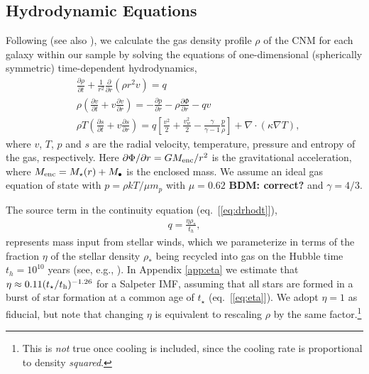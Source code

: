 \documentclass[usenatbib,fleqn]{mn2e}
\newcommand{\dxdy}[2]{\frac{\partial #1}{\partial #2} }
\newcommand{\drhodt}{\dxdy{\rho}{t}}
\newcommand{\dpdr}{\dxdy{p}{r}}
\newcommand{\dphidr}{\dxdy{\Phi}{r}}
\newcommand{\ke}{\frac{v^2}{2}}
\newcommand{\kew}{\frac{v_w^2}{2}}
\newcommand{\gammaf}{\frac{\gamma}{\gamma-1}}
\newcommand{\cs}{\frac{p}{\rho}}
\newcommand{\rhostar}{\rho_*}
\renewcommand{\th}{t_h}
\begin{document}


\subsection{Hydrodynamic Equations}
\label{sec:hydro}

Following \citet{Quataert:2004a} (see also \citealt{HolzerAxford:1970a,De-ColleGuillochon+:2012a,ShcherbakovWong+:2014a}), we calculate the gas density profile $\rho$ of the CNM for each galaxy within our sample by solving the equations of one-dimensional (spherically symmetric) time-dependent hydrodynamics,
\begin{align}
  &\drhodt+\frac{1}{r^2}\frac{\partial}{\partial r}\left(\rho r^2 v\right)=q \label{eq:drhodt}\\
  &\rho \left(\frac{\partial v}{\partial t} + v\frac{\partial v}{\partial r}\right) =-\dpdr-\rho \dphidr-q v \label{eq:dvdt}\\
  &\rho T\left(\frac{\partial s}{\partial t} + v\frac{\partial s}{\partial r}\right)=q\left[\ke+\kew-\gammaf \cs \right] + \nabla\cdot(\kappa \nabla T), \label{eq:dsdt}
\end{align}
where $v$, $T$, $p$ and $s$ are the radial velocity, temperature, pressure and entropy of the gas, respectively.  Here $\partial \Phi/\partial r = GM_{\rm enc}/r^{2}$ is the gravitational acceleration, where $M_{\rm enc} = M_{\star}(r) + M_{\bullet}$ is the enclosed mass.  We assume an ideal gas equation of state with $p = \rho kT/\mu m_p$ with $\mu = 0.62$ {\bf BDM: correct?} and $\gamma = 4/3$.  

The source term in the continuity equation (eq.~[\ref{eq:drhodt}]),
\begin{align}
  q=\frac{\eta \rhostar}{\th},
\label{eq:q}
\end{align}
represents mass input from stellar winds, which we parameterize in terms of the fraction $\eta$ of the stellar density $\rhostar$ being recycled into gas on the Hubble time $\th = 10^{10}$ years (see, e.g., \citealt{Ciotti+91}).  In Appendix \ref{app:eta} we estimate that $\eta \approx 0.11(t_{\star}/t_{\rm h})^{-1.26}$ for a Salpeter IMF, assuming that all stars are formed in a burst of star formation at a common age of $t_{\star}$ (eq.~[\ref{eq:eta}]).  We adopt $\eta=1$ as fiducial, but note that changing $\eta$ is equivalent to rescaling $\rho$ by the same factor.\footnote{This is {\it not} true once cooling is included, since the cooling rate is proportional to density {\it squared}.}  
\end{document}
